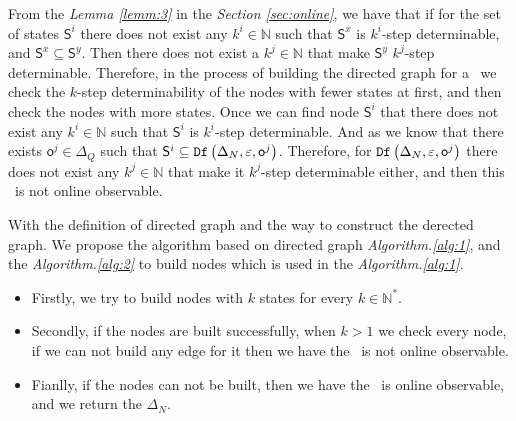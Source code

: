 From the {\em Lemma \ref{lemm:3}} in the {\em Section \ref{sec:online}}, we have that if for the set of states $\mathsf{S}^i$ there does not exist any $k^{i}\in \mathbb{N}$ such that $\mathsf{S}^{x}$ is $k^{i}$-step determinable, and $\mathsf{S}^{x}\subseteq \mathsf{S}^{y}$. Then there does not exist a $k^{j}\in \mathbb{N}$ that make $\mathsf{S}^{y}$ $k^{j}$-step determinable. Therefore, in the process of building the directed graph for a \BCN\ we check the $k$-step determinability of the nodes with fewer states at first, and then check the nodes with more states. Once we can find node $\mathsf{S}^i$ that there does not exist any $k^{i}\in \mathbb{N}$ such that $\mathsf{S}^{i}$ is $k^{i}$-step determinable. And as we know that there exists $\mathsf{o}^{j}\in \Delta_Q$ such that $\mathsf{S}^{i}\subseteq {\tt Df}\left(\Delta_N,\varepsilon, \mathsf{o}^{j}\right)$. Therefore, for ${\tt Df}\left(\Delta_N,\varepsilon, \mathsf{o}^{j}\right)$ there does not exist any $k^{j}\in \mathbb{N}$ that make it $k^{j}$-step determinable either, and then this \BCN\ is not online observable. %

With the definition of directed graph and the way to construct the derected graph. We propose the algorithm based on directed graph {\em Algorithm.\ref{alg:1}}, and the {\em Algorithm.\ref{alg:2}} to build nodes which is used in the {\em Algorithm.\ref{alg:1}}.

\begin{itemize}
\item  Firstly, we try to build nodes with $k$ states for every $k\in \mathbb{N}^*$.
\item Secondly, if the nodes are built successfully, when $k>1$ we check every node, if we can not build any edge for it then we have the \BCN\ is not online observable.
\item Fianlly, if the nodes can not be built, then we have the \BCN\ is online observable, and we return the $\Delta_N$.
 \end{itemize}

